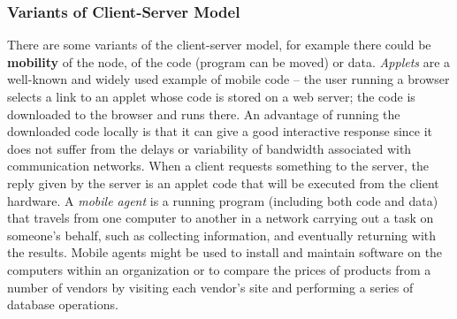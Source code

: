\subsubsection{Variants of Client-Server Model}
There are some variants of the client-server model, for example there could be \textbf{mobility} of the node, of the code (program can be moved) or data.
\textit{Applets} are a well-known and widely used example of mobile code – the user running a browser selects a link to an applet whose code is stored on a web server; the code is downloaded to the browser and runs there. An advantage of running the downloaded code locally is that it can give a good interactive response since it does not suffer from the delays or variability of bandwidth associated with communication networks. When a client requests something to the server, the reply given by the server is an applet code that will be executed from the client hardware.
A \textit{mobile agent} is a running program (including both code and data) that travels from one computer to another in a network carrying out a task on someone’s behalf, such as collecting information, and eventually returning with the results. Mobile agents might be used to install and maintain software on the computers within an organization or to compare the prices of products from a number of vendors by visiting each vendor’s site and performing a series of database operations.


